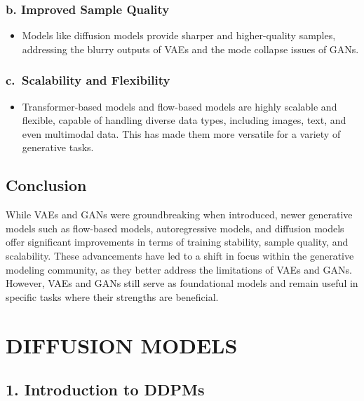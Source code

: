 \documentclass[
]{book}
\providecommand{\tightlist}{%
  \setlength{\itemsep}{0pt}\setlength{\parskip}{0pt}}
\begin{document}
\subsection{b. Improved Sample Quality}\label{b.-improved-sample-quality}

\begin{itemize}
\tightlist
\item
  Models like diffusion models provide sharper and higher-quality samples, addressing the blurry outputs of VAEs and the mode collapse issues of GANs.
\end{itemize}

\subsection{c.~Scalability and Flexibility}\label{c.-scalability-and-flexibility}

\begin{itemize}
\tightlist
\item
  Transformer-based models and flow-based models are highly scalable and flexible, capable of handling diverse data types, including images, text, and even multimodal data. This has made them more versatile for a variety of generative tasks.
\end{itemize}

\section{Conclusion}\label{conclusion-1}

While VAEs and GANs were groundbreaking when introduced, newer generative models such as flow-based models, autoregressive models, and diffusion models offer significant improvements in terms of training stability, sample quality, and scalability. These advancements have led to a shift in focus within the generative modeling community, as they better address the limitations of VAEs and GANs. However, VAEs and GANs still serve as foundational models and remain useful in specific tasks where their strengths are beneficial.

\chapter{DIFFUSION MODELS}\label{diffusion-models}

\section{1. Introduction to DDPMs}\label{introduction-to-ddpms}
\end{document}
